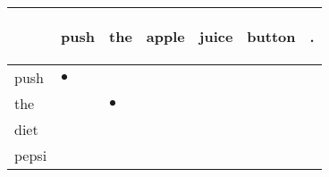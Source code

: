 \documentclass[landscape]{article}
\newcommand{\ssp}{\hspace{2pt}}
\newcommand{\mex}{\cellcolor{g}$\bullet$}
\begin{document}
\noindent\begin{tabular}{|l|p{10pt}|p{10pt}|p{10pt}|p{10pt}|p{10pt}|p{10pt}|}
\hline
&\begin{sideways}\cellcolor{ref0}push\hspace{12pt}\end{sideways}&\begin{sideways}\cellcolor{ref1}the\hspace{12pt}\end{sideways}&\begin{sideways}\cellcolor{ref2}apple\hspace{12pt}\end{sideways}&\begin{sideways}\cellcolor{ref3}juice\hspace{12pt}\end{sideways}&\begin{sideways}\cellcolor{ref4}button\hspace{12pt}\end{sideways}&\begin{sideways}\cellcolor{ref5}.\hspace{12pt}\end{sideways}\\
\hline
\ssp \cellcolor{ref0}push \ssp&\hspace{2pt}\mex&\hspace{2pt}&\hspace{2pt}&\hspace{2pt}&\hspace{2pt}&\hspace{2pt}\\
\hline
\ssp \cellcolor{ref1}the \ssp&\hspace{2pt}&\hspace{2pt}\mex&\hspace{2pt}&\hspace{2pt}&\hspace{2pt}&\hspace{2pt}\\
\hline
\ssp diet \ssp&\hspace{2pt}&\hspace{2pt}&\hspace{2pt}&\hspace{2pt}&\hspace{2pt}&\hspace{2pt}\\
\hline
\ssp pepsi \ssp&\hspace{2pt}&\hspace{2pt}&\hspace{2pt}&\hspace{2pt}&\hspace{2pt}&\hspace{2pt}\\

\end{tabular}
\end{document}

